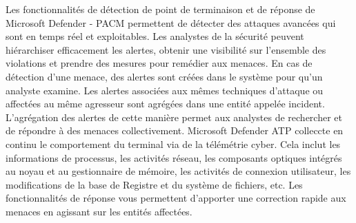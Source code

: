 Les fonctionnalités de détection de point de terminaison et de réponse de Microsoft Defender - PACM permettent de détecter des attaques avancées qui sont en temps réel et exploitables. Les analystes de la sécurité peuvent hiérarchiser efficacement les alertes, obtenir une visibilité sur l’ensemble des violations et prendre des mesures pour remédier aux menaces.
En cas de détection d’une menace, des alertes sont créées dans le système pour qu’un analyste examine. Les alertes associées aux mêmes techniques d’attaque ou affectées au même agresseur sont agrégées dans une entité appelée incident. L’agrégation des alertes de cette manière permet aux analystes de rechercher et de répondre à des menaces collectivement.
Microsoft Defender ATP colleccte en continu le comportement du terminal via de la télémétrie cyber. Cela inclut les informations de processus, les activités réseau, les composants optiques intégrés au noyau et au gestionnaire de mémoire, les activités de connexion utilisateur, les modifications de la base de Registre et du système de fichiers, etc.  Les fonctionnalités de réponse vous permettent d’apporter une correction rapide aux menaces en agissant sur les entités affectées.